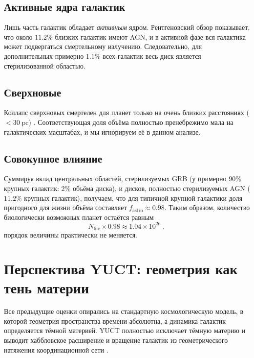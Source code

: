 \documentclass[11pt,a4paper]{article}
\begin{document}
	\subsection{Активные ядра галактик}
	\label{sec:agn}
	Лишь часть галактик обладает \emph{активным} ядром. Рентгеновский обзор \citet{Foord2017} показывает, что около \(11.2\%\) близких галактик имеют AGN, и в активной фазе вся галактика может подвергаться смертельному излучению. Следовательно, для дополнительных примерно \(1.1\%\) всех галактик весь диск является стерилизованной областью.
	
	\subsection{Сверхновые}
	\label{sec:sne}
	Коллапс сверхновых смертелен для планет только на очень близких расстояниях (\(< 30\;\mathrm{pc}\)) \citep{ThomasYelland2023}. Соответствующая доля объёма полностью пренебрежимо мала на галактических масштабах, и мы игнорируем её в данном анализе.
	
	\subsection{Совокупное влияние}
	\label{sec:total_astro}
	Суммируя вклад центральных областей, стерилизуемых GRB (у примерно \(90\%\) крупных галактик: \(2\%\) объёма диска), и дисков, полностью стерилизуемых AGN (\(11.2\%\) крупных галактик), получаем, что для типичной крупной галактики доля пригодного для жизни объёма составляет \(f_{\mathrm{astro}} \approx 0.98\). Таким образом, количество биологически возможных планет остаётся равным
	\begin{equation}
		N_{\mathrm{life}} \times 0.98 \approx 1.04\times 10^{26}\; ,
	\end{equation}
	порядок величины практически не меняется.
	
	\section{Перспектива YUCT: геометрия как тень материи}
	\label{sec:yuct_geometry}
	Все предыдущие оценки опирались на стандартную космологическую модель, в которой геометрия пространства-времени абсолютна, а динамика галактик определяется тёмной материей. YUCT полностью исключает тёмную материю и выводит хаббловское расширение и вращение галактик из геометрического натяжения координационной сети \citep{YUCT,AppGravity}.
	
\end{document}
